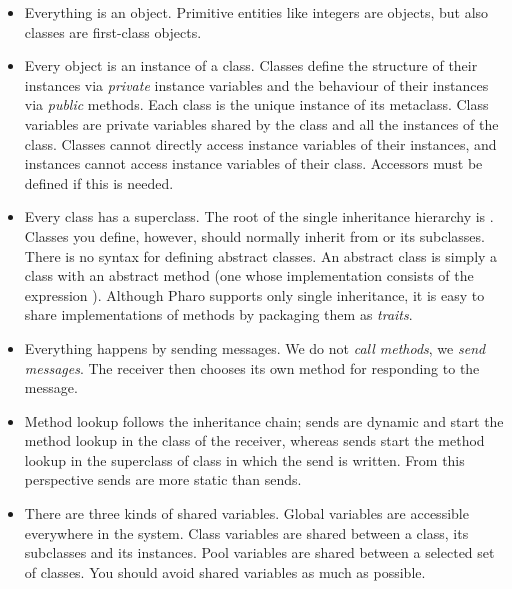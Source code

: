 \documentclass[10pt,twoside,english]{_support/latex/sbabook/sbabook}
\begin{document}
\begin{itemize}
\item Everything is an object. Primitive entities like integers are objects, but also classes are first-class objects.
\item Every object is an instance of a class. Classes define the structure of their instances via \textit{private} instance variables and the behaviour of their instances via \textit{public} methods. Each class is the unique instance of its metaclass. Class variables are private variables shared by the class and all the instances of the class. Classes cannot directly access instance variables of their instances, and instances cannot access instance variables of their class. Accessors must be defined if this is needed.
\item Every class has a superclass. The root of the single inheritance hierarchy is . Classes you define, however, should normally inherit from  or its subclasses. There is no syntax for defining abstract classes. An abstract class is simply a class with an abstract method (one whose implementation consists of the expression ). Although Pharo supports only single inheritance, it is easy to share implementations of methods by packaging them as \textit{traits}.
\item Everything happens by sending messages. We do not \textit{call methods}, we \textit{send messages}. The receiver then chooses its own method for responding to the message.
\item Method lookup follows the inheritance chain;  sends are dynamic and start the method lookup in the class of the receiver, whereas  sends start the method lookup in the superclass of class in which the  send is written. From this perspective  sends are more static than  sends.
\item There are three kinds of shared variables. Global variables are accessible everywhere in the system. Class variables are shared between a class, its subclasses and its instances. Pool variables are shared between a selected set of classes. You should avoid shared variables as much as possible.
\end{itemize}


\backmatter

\end{document}
